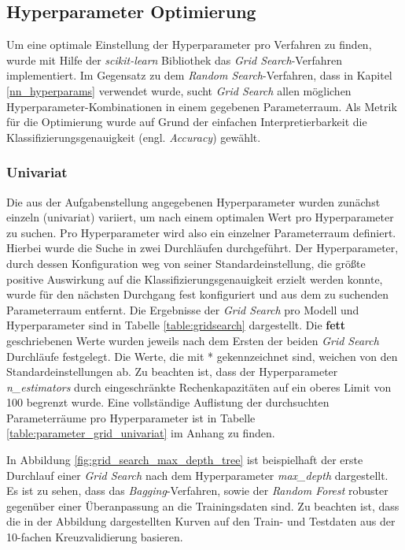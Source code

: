 \subsection{Hyperparameter Optimierung}
Um eine optimale Einstellung der Hyperparameter pro Verfahren zu finden, wurde mit Hilfe der \emph{scikit-learn} Bibliothek das \emph{Grid Search}-Verfahren implementiert. Im Gegensatz zu dem \emph{Random Search}-Verfahren, dass in Kapitel \ref{nn_hyperparams} verwendet wurde, sucht \emph{Grid Search} allen möglichen Hyperparameter-Kombinationen in einem gegebenen Parameterraum.  Als Metrik für die Optimierung wurde auf Grund der einfachen Interpretierbarkeit die Klassifizierungsgenauigkeit (engl. \emph{Accuracy}) gewählt.

\subsubsection{Univariat}
\label{section:univariat}
Die aus der Aufgabenstellung angegebenen Hyperparameter wurden zunächst einzeln (univariat) variiert, um nach einem optimalen Wert pro Hyperparameter zu suchen. Pro Hyperparameter wird also ein einzelner Parameterraum definiert. Hierbei wurde die Suche in zwei Durchläufen durchgeführt. Der Hyperparameter, durch dessen Konfiguration weg von seiner Standardeinstellung, die größte positive Auswirkung auf die Klassifizierungsgenauigkeit erzielt werden konnte, wurde für den  nächsten Durchgang fest konfiguriert und aus dem zu suchenden Parameterraum entfernt. Die Ergebnisse der \emph{Grid Search} pro Modell und Hyperparameter sind in Tabelle \ref{table:gridsearch} dargestellt. Die \textbf{fett} geschriebenen Werte wurden jeweils nach dem Ersten der beiden \emph{Grid Search} Durchläufe festgelegt. Die Werte, die mit * gekennzeichnet sind, weichen von den Standardeinstellungen ab. Zu beachten ist, dass der Hyperparameter \emph{n\_estimators} durch eingeschränkte Rechenkapazitäten auf ein oberes Limit von 100 begrenzt wurde. Eine vollständige Auflistung der durchsuchten Parameterräume pro Hyperparameter ist in Tabelle \ref{table:parameter_grid_univariat} im Anhang zu finden.

In Abbildung \ref{fig:grid_search_max_depth_tree} ist  beispielhaft der erste Durchlauf einer \emph{Grid Search} nach dem Hyperparameter \emph{max\_depth} dargestellt. Es ist zu sehen, dass das \emph{Bagging}-Verfahren, sowie der \emph{Random Forest} robuster gegenüber einer Überanpassung an die Trainingsdaten sind. Zu beachten ist, dass die in der Abbildung dargestellten Kurven auf den Train- und Testdaten aus der 10-fachen Kreuzvalidierung basieren. 

